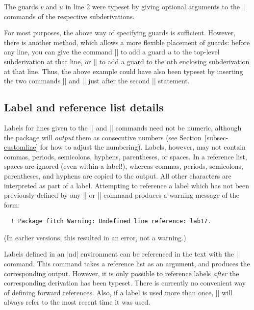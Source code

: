 \documentclass{ltxdoc}
\newcommand\NewIn[1]{\leavevmode
  \marginpar{\hfill\fbox{\fbox{New in #1}}\hspace*{1em}}\ignorespaces}
\begin{document}
The guards $v$ and $u$ in line 2 were typeset by giving optional
arguments to the |\open| commands of the respective
subderivations. 

\DescribeMacro{\guard}
For most purposes, the above way of specifying guards is sufficient.
However, there is another method, which allows a more flexible
placement of guards: before any line, you can give the command
|| to add a guard $u$ to the top-level subderivation at
that line, or || to add a guard to the $n$th
enclosing subderivation at that line. Thus, the above example could
have also been typeset by inserting the two commands || and
|| just after the second |\open| statement.


\subsection{Label and reference list details}\label{subsec-ndref}

Labels for lines given to the |\have| and |\hypo| commands need not be
numeric, although the package will \emph{output} them as consecutive
numbers (see Section~\ref{subsec-customline} for how to adjust the
numbering). Labels, however, may not contain commas, periods,
semicolons, hyphens, parentheses, or spaces. In a reference list,
spaces are ignored (even within a label!), whereas commas, periods,
semicolons, parentheses, and hyphens are copied to the output. All
other characters are interpreted as part of a label. Attempting to
reference a label which has not been previously defined by any |\hypo|
or |\have| command produces a \NewIn{0.6} warning message of the form:
\begin{verbatim}
  ! Package fitch Warning: Undefined line reference: lab17.
\end{verbatim}
(In earlier versions, this resulted in an error, not a warning.)

\DescribeMacro{\ndref}
Labels defined in an |nd| environment can be referenced in the
text with the |\ndref| command. This command takes a reference
list as an argument, and produces the corresponding output. However,
it is only possible to reference labels \emph{after} the corresponding
derivation has been typeset. There is currently no convenient way of
defining forward references. Also, if a label is used more than once,
|\ndref| will always refer to the most recent time it was used.
\end{document}
